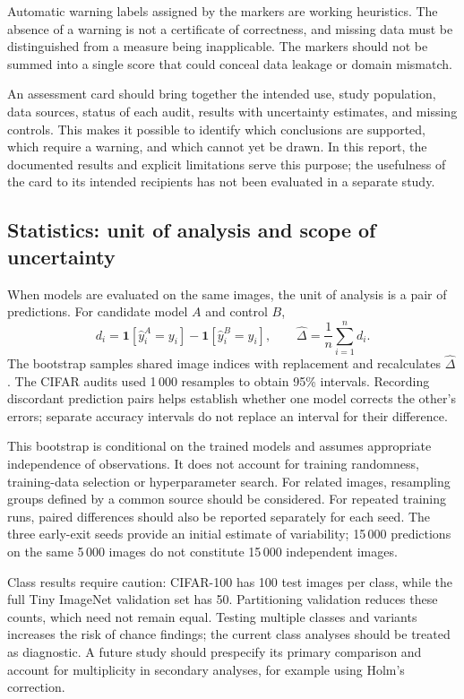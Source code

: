 \documentclass[12pt,a4paper]{article}
\begin{document}
Automatic warning labels assigned by the markers are working heuristics.
The absence of a warning is not a certificate of correctness, and missing
data must be distinguished from a measure being inapplicable.
The markers should not be summed into a single score that could conceal
data leakage or domain mismatch.

An assessment card should bring together the intended use, study population,
data sources, status of each audit, results with uncertainty estimates,
and missing controls. This makes it possible to identify which conclusions
are supported, which require a warning, and which cannot yet be drawn.
In this report, the documented results and explicit limitations serve
this purpose; the usefulness of the card to its intended recipients
has not been evaluated in a separate study.

\subsection{Statistics: unit of analysis and scope of uncertainty}

When models are evaluated on the same images, the unit of analysis is
a pair of predictions. For candidate model $A$ and control $B$,
\begin{equation}
d_i=\mathbf{1}[\hat y_i^A=y_i]-\mathbf{1}[\hat y_i^B=y_i],
\qquad \widehat{\Delta}=\frac{1}{n}\sum_{i=1}^{n}d_i.
\end{equation}
The bootstrap samples shared image indices with replacement and
recalculates $\widehat{\Delta}$.
The CIFAR audits used 1\,000 resamples to obtain 95\% intervals.
Recording discordant prediction pairs helps establish whether one model
corrects the other's errors; separate accuracy intervals do not replace
an interval for their difference.

This bootstrap is conditional on the trained models and assumes
appropriate independence of observations.
It does not account for training randomness, training-data selection
or hyperparameter search.
For related images, resampling groups defined by a common source should
be considered. For repeated training runs, paired differences should
also be reported separately for each seed.
The three early-exit seeds provide an initial estimate of variability;
15\,000 predictions on the same 5\,000 images do not constitute
15\,000 independent images.

Class results require caution: CIFAR-100 has 100 test images per class,
while the full Tiny ImageNet validation set has 50.
Partitioning validation reduces these counts, which need not remain equal.
Testing multiple classes and variants increases the risk of chance
findings; the current class analyses should be treated as diagnostic.
A future study should prespecify its primary comparison and account
for multiplicity in secondary analyses, for example using Holm's correction.
\end{document}
